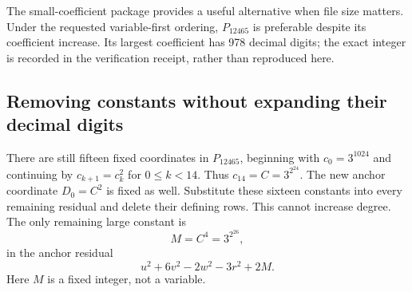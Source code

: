 \documentclass[11pt]{article}
\theoremstyle{definition}
\begin{document}
The small-coefficient package provides a useful alternative when file
size matters. Under the requested variable-first ordering,
$P_{12465}$ is preferable despite its coefficient increase. Its largest
coefficient has 978 decimal digits; the exact integer is recorded in the
verification receipt, rather than reproduced here.

\subsection{Removing constants without expanding their decimal digits}

There are still fifteen fixed coordinates in $P_{12465}$, beginning
with $c_0=3^{1024}$ and continuing by $c_{k+1}=c_k^2$ for
$0\leq k<14$. Thus $c_{14}=C=3^{2^{24}}$. The new anchor coordinate
$D_0=C^2$ is fixed as well. Substitute these sixteen constants into
every remaining residual and delete their defining rows. This cannot
increase degree. The only remaining large constant is
\[
 M=C^4=3^{2^{26}},
\]
in the anchor residual
\[
 u^2+6v^2-2w^2-3r^2+2M.
\]
Here $M$ is a fixed integer, not a variable.
\end{document}
